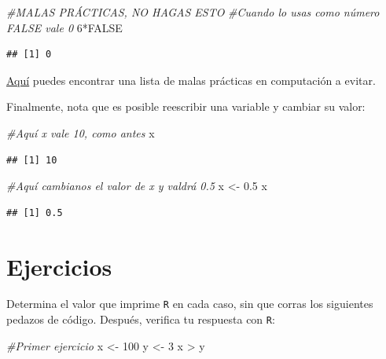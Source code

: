 \documentclass[]{tufte-book}
\newenvironment{Shaded}{}{}
\newcommand{\CommentTok}[1]{\textcolor[rgb]{0.38,0.63,0.69}{\textit{#1}}}
\newcommand{\ConstantTok}[1]{\textcolor[rgb]{0.53,0.00,0.00}{#1}}
\newcommand{\DecValTok}[1]{\textcolor[rgb]{0.25,0.63,0.44}{#1}}
\newcommand{\FloatTok}[1]{\textcolor[rgb]{0.25,0.63,0.44}{#1}}
\newcommand{\NormalTok}[1]{#1}
\newcommand{\OtherTok}[1]{\textcolor[rgb]{0.00,0.44,0.13}{#1}}
\newcommand{\SpecialCharTok}[1]{\textcolor[rgb]{0.25,0.44,0.63}{#1}}
\begin{document}
\begin{Shaded}
\begin{Highlighting}[]
\CommentTok{\#MALAS PRÁCTICAS, NO HAGAS ESTO}
\CommentTok{\#Cuando lo usas como número FALSE vale 0}
\DecValTok{6}\SpecialCharTok{*}\ConstantTok{FALSE}
\end{Highlighting}
\end{Shaded}

\begin{verbatim}
## [1] 0
\end{verbatim}

\begin{marginfigure}
\href{https://medium.com/mindorks/common-bad-programming-practices-7fb470ed74d2}{Aquí}
puedes encontrar una lista de malas prácticas en computación a evitar.
\end{marginfigure}

Finalmente, nota que es posible reescribir una variable y cambiar su
valor:

\begin{Shaded}
\begin{Highlighting}[]
\CommentTok{\#Aquí x vale 10, como antes}
\NormalTok{x}
\end{Highlighting}
\end{Shaded}

\begin{verbatim}
## [1] 10
\end{verbatim}

\begin{Shaded}
\begin{Highlighting}[]
\CommentTok{\#Aquí cambianos el valor de x y valdrá 0.5}
\NormalTok{x }\OtherTok{\textless{}{-}} \FloatTok{0.5}
\NormalTok{x}
\end{Highlighting}
\end{Shaded}

\begin{verbatim}
## [1] 0.5
\end{verbatim}

\hypertarget{ejercicios}{%
\section{Ejercicios}\label{ejercicios}}

Determina el valor que imprime \texttt{R} en cada caso, sin que corras
los siguientes pedazos de código. Después, verifica tu respuesta con
\texttt{R}:

\begin{Shaded}
\begin{Highlighting}[]
\CommentTok{\#Primer ejercicio}
\NormalTok{x }\OtherTok{\textless{}{-}} \DecValTok{100}
\NormalTok{y }\OtherTok{\textless{}{-}} \DecValTok{3}
\NormalTok{x }\SpecialCharTok{\textgreater{}}\NormalTok{ y}
\end{Highlighting}
\end{Shaded}
\end{document}
